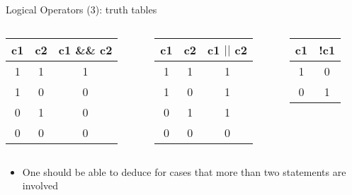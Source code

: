 \begin{frame}[fragile]{Logical Operators (3): truth tables}
\begin{columns}
\begin{column}{0.32\linewidth}
\begin{table}
\begin{center}
\begin{tabular}{|c|c|c|}
\hline
c1 & c2 & c1 \&\& c2 \\ \hline \hline
1 & 1 & 1 \\ \hline
1 & 0 & 0 \\ \hline
0 & 1 & 0 \\ \hline
0 & 0 & 0 \\ \hline
\end{tabular}
\end{center}
\end{table}
\end{column}
\begin{column}{0.32\linewidth}
\begin{table}
\begin{center}
\begin{tabular}{|c|c|c|}
\hline
c1 & c2 & c1 $||$ c2 \\ \hline \hline
1 & 1 & 1 \\ \hline
1 & 0 & 1 \\ \hline
0 & 1 & 1 \\ \hline
0 & 0 & 0 \\ \hline
\end{tabular}
\end{center}
\end{table}
\end{column}
\begin{column}{0.25\linewidth}
\begin{table}
\begin{center}
\begin{tabular}{|c|c|}
\hline
c1 & !c1 \\ \hline
1 & 0  \\ \hline
0 & 1  \\ \hline
\end{tabular}
\end{center}
\end{table}
\end{column}
\end{columns}
\begin{itemize}
	\item {One should be able to deduce for cases that more than two statements are involved}
\end{itemize}
\end{frame}

